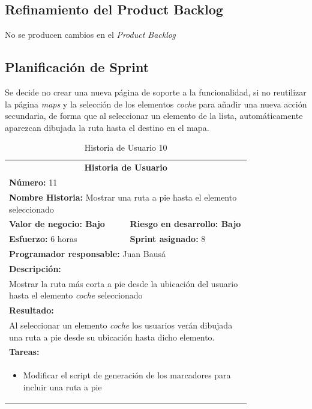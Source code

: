 	\subsection{Refinamiento del Product Backlog}
	No se producen cambios en el \textit{Product Backlog}

	\subsection{Planificación de Sprint}
	Se decide no crear una nueva página de soporte a la funcionalidad, si no reutilizar la página \textit{maps} y la selección de los elementos \textit{coche} para añadir una nueva acción secundaria, de forma que al seleccionar un elemento de la lista, automáticamente aparezcan dibujada la ruta hasta el destino en el mapa.
	
		\begin{table}[H]
	  \centering 
	 	\begin{tabular}{p{0.4\linewidth}p{0.4\linewidth}}
	    \toprule
	    \multicolumn{2}{c}{\cellcolor{black!30}\textbf{Historia de Usuario}} 													\\
		\multicolumn{2}{l}{\cellcolor{gray!25}\textbf{Número: }11}																\\
		\multicolumn{2}{l}{\textbf{Nombre Historia: } Mostrar una ruta a pie hasta el elemento seleccionado}						\\
		\cellcolor{gray!25}\textbf{Valor de negocio: Bajo}	&	\cellcolor{gray!25}\textbf{Riesgo en desarrollo: Bajo}	\\
		\textbf{Esfuerzo:} 6 horas				&	\textbf{Sprint asignado: }8 												\\
		\multicolumn{2}{l}{\cellcolor{gray!25}\textbf{Programador responsable: }Juan Bausá}									\\
		\multicolumn{2}{l}{\textbf{Descripción:}}                                                     						\\
		\multicolumn{2}{l}{\parbox{15cm}{Mostrar la ruta más corta a pie desde la ubicación del usuario hasta el elemento \textit{coche} seleccionado}}				\\
		\multicolumn{2}{l}{\cellcolor{gray!25}\textbf{Resultado:}}																\\		
		\multicolumn{2}{l}{\parbox{15cm}{Al seleccionar un elemento \textit{coche} los usuarios verán dibujada una ruta a pie desde su ubicación hasta dicho elemento.}}																								\\
		\multicolumn{2}{l}{\textbf{Tareas:}}																					\\
		\multicolumn{2}{l}{
			\begin{minipage}{12cm}
	    		\vskip 4pt
	    		\begin{itemize}
	    			\item Modificar el script de generación de los marcadores para incluir una ruta a pie
				\end{itemize}
			  	\vskip 4pt
		 	\end{minipage}
		} \\																				
	    \hline
	  \end{tabular}
	  \caption{Historia de Usuario 10}
	\end{table}
	
